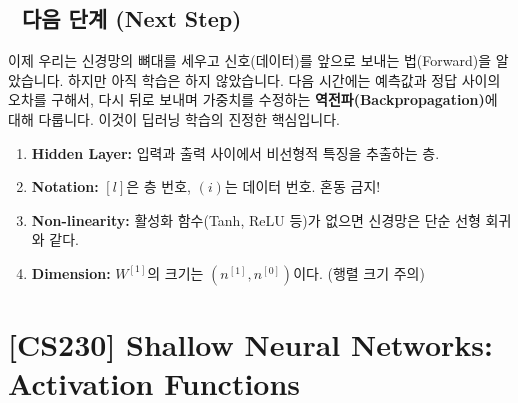 \documentclass[11pt,a4paper]{book}
\theoremstyle{definition}
\begin{document}
\section*{🔗 다음 단계 (Next Step)}
이제 우리는 신경망의 뼈대를 세우고 신호(데이터)를 앞으로 보내는 법(Forward)을 알았습니다.
하지만 아직 학습은 하지 않았습니다. 다음 시간에는 예측값과 정답 사이의 오차를 구해서, 다시 뒤로 보내며 가중치를 수정하는 \textbf{역전파(Backpropagation)}에 대해 다룹니다. 이것이 딥러닝 학습의 진정한 핵심입니다.

\vspace{0.5cm}

\begin{summarybox}[title={단원 요약 (Cheat Sheet)}]
\begin{enumerate}
    \item \textbf{Hidden Layer:} 입력과 출력 사이에서 비선형적 특징을 추출하는 층.
    \item \textbf{Notation:} $[l]$은 층 번호, $(i)$는 데이터 번호. 혼동 금지!
    \item \textbf{Non-linearity:} 활성화 함수(Tanh, ReLU 등)가 없으면 신경망은 단순 선형 회귀와 같다.
    \item \textbf{Dimension:} $W^{[1]}$의 크기는 $(n^{[1]}, n^{[0]})$이다. (행렬 크기 주의)
\end{enumerate}
\end{summarybox}


\chapter{[CS230] Shallow Neural Networks: \\ Activation Functions}
\label{ch:lecture7}

\end{document}
